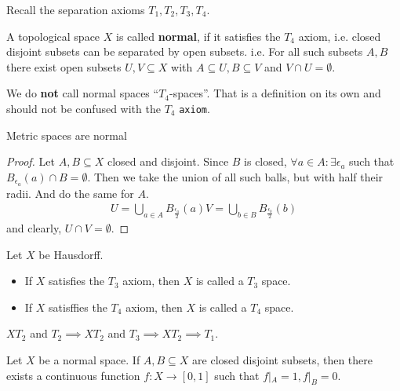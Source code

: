 Recall the separation axioms $T_1,T_2,T_3,T_4$.
\begin{dfn}[]
  A topological space $X$ is called \textbf{normal}, if it satisfies the $T_4$ axiom, i.e. closed disjoint subsets can be separated by open subsets.
  i.e. For all such subsets $A,B$ there exist open subsets $U,V \subseteq X$ with $A \subseteq U, B \subseteq V$ and $V \cap U = \emptyset$.
  
\end{dfn}
\begin{rem}[]
  We do \textbf{not} call normal spaces ``$T_4$-spaces''. That is a definition on its own and should not be confused with the $T_4$ \texttt{axiom}.
\end{rem}
\begin{lem}[]
Metric spaces are normal
\end{lem}
\begin{proof}
Let $A,B \subseteq X$ closed and disjoint.
Since $B$ is closed, $\forall  a \in A: \exists \epsilon_a$ such that $B_{\epsilon_a}(a) \cap B = \emptyset$.
Then we take the union of all such balls, but with half their radii. And do the same for $A$.
\begin{align*}
  U = \bigcup_{a \in A}B_{\frac{\epsilon_a}{2}}(a)
  V = \bigcup_{b \in B}B_{\frac{\epsilon_b}{2}}(b)
\end{align*}
and clearly, $U \cap V = \emptyset$.
\end{proof}


\begin{dfn}[]
Let $X$ be Hausdorff. 
\begin{itemize}
  \item If $X$ satisfies the $T_3$ axiom, then $X$ is called a $T_3$ space.
  \item If $X$ satisffies the $T_4$ axiom, then $X$ is called a $T_4$ space.
\end{itemize}
\end{dfn}
\begin{rem}[]
  $X T_2$ and $T_2 \implies X T_2$ and $T_3 \implies X T_2 \implies T_1$. 
\end{rem}


\begin{thm}
Let $X$ be a normal space. If $A,B \subseteq X$ are closed disjoint subsets, then there exists a continuous function
$f: X \to [0,1]$ such that $f|_A = 1, f|_B = 0$.
\end{thm}

